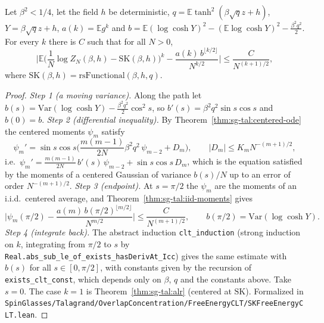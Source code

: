 \begin{theorem}\label{thm:sg-tal:free-energy-clt}
  \leanok
{}
Let $\beta^2<1/4$, let the field $h$ be deterministic, $q=\mathbb E\tanh^2(\beta\sqrt qz+h)$, $Y=\beta\sqrt qz+h$, $a(k)=\mathbb E g^k$ and $b=\mathbb E(\log\cosh Y)^2-(\mathbb E\log\cosh Y)^2-\frac{\beta^2q^2}2$. For every $k$ there is $C$ such that for all $N>0$,
$$\Big|\mathbb E\Big(\frac1N\log Z_N(\beta,h)-\mathrm{SK}(\beta,h)\Big)^k-\frac{a(k)\,b^{\lfloor k/2\rfloor}}{N^{k/2}}\Big|\le\frac{C}{N^{(k+1)/2}},$$
where $\mathrm{SK}(\beta,h)=\mathrm{rsFunctional}(\beta,h,q)$.
\end{theorem}
\begin{proof}
  \leanok
\emph{Step 1 (a moving variance).} Along the path let $b(s)=\mathrm{Var}(\log\cosh Y)-\frac{\beta^2q^2}2\cos^2s$, so $b'(s)=\beta^2q^2\sin s\cos s$ and $b(0)=b$.
\emph{Step 2 (differential inequality).} By Theorem~\ref{thm:sg-tal:centered-ode} the centered moments $\psi_m$ satisfy
\[
\psi_m'=\sin s\cos s\Big(\frac{m(m-1)}{2N}\beta^2q^2\,\psi_{m-2}+D_m\Big),\qquad|D_m|\le K_mN^{-(m+1)/2},
\]
i.e.\ $\psi_m'=\frac{m(m-1)}{2N}\,b'(s)\,\psi_{m-2}+\sin s\cos s\,D_m$, which is the equation satisfied by the moments of a centered Gaussian of variance $b(s)/N$ up to an error of order $N^{-(m+1)/2}$.
\emph{Step 3 (endpoint).} At $s=\pi/2$ the $\psi_m$ are the moments of an i.i.d.\ centered average, and Theorem~\ref{thm:sg-tal:iid-moments} gives
\[
\Big|\psi_m(\pi/2)-\frac{a(m)\,b(\pi/2)^{\lfloor m/2\rfloor}}{N^{m/2}}\Big|\le\frac C{N^{(m+1)/2}},\qquad b(\pi/2)=\mathrm{Var}(\log\cosh Y).
\]
\emph{Step 4 (integrate back).} The abstract induction \texttt{clt\_induction} (strong induction on $k$, integrating from $\pi/2$ to $s$ by \texttt{Real.abs\_sub\_le\_of\_exists\_hasDerivAt\_Icc}) gives the same estimate with $b(s)$ for all $s\in[0,\pi/2]$, with constants given by the recursion of \texttt{exists\_clt\_const}, which depends only on $\beta$, $q$ and the constants above. Take $s=0$. The case $k=1$ is Theorem~\ref{thm:sg-tal:alr} (centered at $\mathrm{SK}$).
Formalized in \texttt{SpinGlasses/Talagrand/OverlapConcentration/FreeEnergyCLT/SKFreeEnergyCLT.lean}.
\end{proof}

